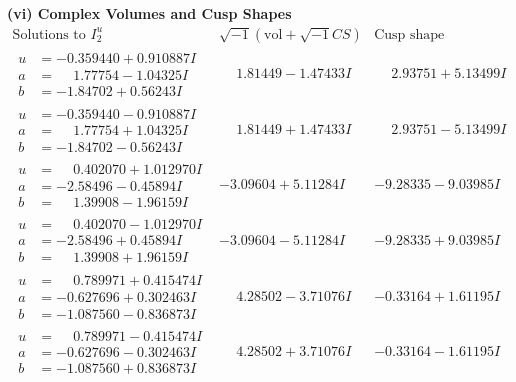 \documentclass[1p]{elsarticle_modified}
\theoremstyle{definition}
\newcommand{\I}{\sqrt{-1}}
\begin{document}
\newpage\flushleft \textbf{(vi) Complex Volumes and Cusp Shapes}
$$\begin{array}{c|c|c}  
\text{Solutions to }I^u_{2}& \I (\text{vol} + \sqrt{-1}CS) & \text{Cusp shape}\\
 \hline 
\begin{aligned}
u &= -0.359440 + 0.910887 I \\
a &= \phantom{-}1.77754 - 1.04325 I \\
b &= -1.84702 + 0.56243 I\end{aligned}
 & \phantom{-}1.81449 - 1.47433 I & \phantom{-}2.93751 + 5.13499 I \\ \hline\begin{aligned}
u &= -0.359440 - 0.910887 I \\
a &= \phantom{-}1.77754 + 1.04325 I \\
b &= -1.84702 - 0.56243 I\end{aligned}
 & \phantom{-}1.81449 + 1.47433 I & \phantom{-}2.93751 - 5.13499 I \\ \hline\begin{aligned}
u &= \phantom{-}0.402070 + 1.012970 I \\
a &= -2.58496 - 0.45894 I \\
b &= \phantom{-}1.39908 - 1.96159 I\end{aligned}
 & -3.09604 + 5.11284 I & -9.28335 - 9.03985 I \\ \hline\begin{aligned}
u &= \phantom{-}0.402070 - 1.012970 I \\
a &= -2.58496 + 0.45894 I \\
b &= \phantom{-}1.39908 + 1.96159 I\end{aligned}
 & -3.09604 - 5.11284 I & -9.28335 + 9.03985 I \\ \hline\begin{aligned}
u &= \phantom{-}0.789971 + 0.415474 I \\
a &= -0.627696 + 0.302463 I \\
b &= -1.087560 - 0.836873 I\end{aligned}
 & \phantom{-}4.28502 - 3.71076 I & -0.33164 + 1.61195 I \\ \hline\begin{aligned}
u &= \phantom{-}0.789971 - 0.415474 I \\
a &= -0.627696 - 0.302463 I \\
b &= -1.087560 + 0.836873 I\end{aligned}
 & \phantom{-}4.28502 + 3.71076 I & -0.33164 - 1.61195 I \\ \hline\begin{aligned}

\end{aligned}
\end{array}$$
\end{document}
